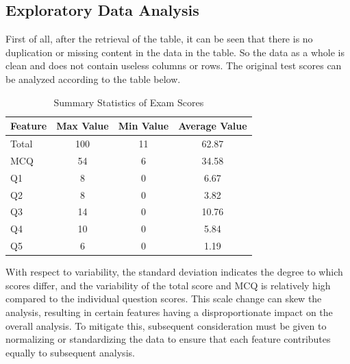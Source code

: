 \documentclass[twocolumn]{IEEEtran}
\begin{document}
\subsection{Exploratory Data Analysis}
First of all, after the retrieval of the table, it can be seen that there is no duplication or missing content in the data in the table. So the data as a whole is clean and does not contain useless columns or rows. The original test scores can be analyzed according to the table below.
\begin{table}[htbp]
    \centering
    \caption{Summary Statistics of Exam Scores}
    \label{tab:exam_stats}
    \begin{tabular}{@{}lccc@{}}
    \toprule
    Feature & Max Value & Min Value & Average Value \\ \midrule
    Total   & 100       & 11        & 62.87         \\
    MCQ     & 54        & 6         & 34.58         \\
    Q1      & 8         & 0         & 6.67          \\
    Q2      & 8         & 0         & 3.82          \\
    Q3      & 14        & 0         & 10.76         \\
    Q4      & 10        & 0         & 5.84          \\
    Q5      & 6         & 0         & 1.19          \\ \bottomrule
    \end{tabular}
\end{table}
With respect to variability, the standard deviation indicates the degree to which scores differ, and the variability of the total score and MCQ is relatively high compared to the individual question scores. This scale change can skew the analysis, resulting in certain features having a disproportionate impact on the overall analysis. To mitigate this, subsequent consideration must be given to normalizing or standardizing the data to ensure that each feature contributes equally to subsequent analysis.

\end{document}
